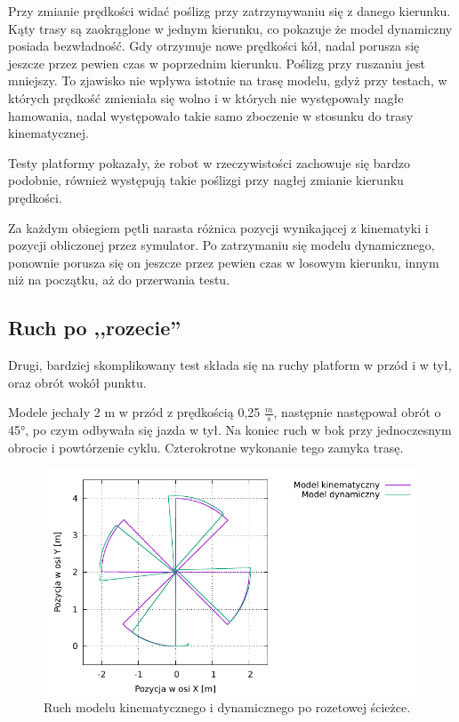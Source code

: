 		Przy zmianie prędkości widać poślizg przy zatrzymywaniu się z danego kierunku.
		Kąty trasy są zaokrąglone w jednym kierunku, co pokazuje że model dynamiczny posiada bezwładność. 
		Gdy otrzymuje nowe prędkości kół, nadal porusza się jeszcze przez pewien czas w poprzednim kierunku.
		Poślizg przy ruszaniu jest mniejszy.
		To zjawisko nie wpływa istotnie na trasę modelu, gdyż przy testach, w których prędkość zmieniała się wolno i w których nie występowały nagłe hamowania,
		nadal występowało takie samo zboczenie w stosunku do trasy kinematycznej.
		
		Testy platformy pokazały, że robot w rzeczywistości zachowuje się bardzo podobnie, również występują takie poślizgi przy nagłej zmianie kierunku prędkości.
		
		Za każdym obiegiem pętli narasta różnica pozycji wynikającej z kinematyki i pozycji obliczonej przez symulator.
		Po zatrzymaniu się modelu dynamicznego, ponownie porusza się on jeszcze przez pewien czas w losowym kierunku, innym niż na początku,
		aż do przerwania testu.
	
	\subsection{Ruch po ,,rozecie''}
		Drugi, bardziej skomplikowany test składa się na ruchy platform w przód i w tył, oraz obrót wokół punktu.
		
		Modele jechały 2 m w przód z prędkością 0,25 $\frac{m}{s}$, następnie następował obrót o 45°, po czym odbywała się jazda w tył.
		Na koniec ruch w bok przy jednoczesnym obrocie i powtórzenie cyklu. Czterokrotne wykonanie tego zamyka trasę.
		
		\begin{figure}[H]
			\centering
			\includegraphics[width=\textwidth]{plots/sun.pdf}
				\caption{Ruch modelu kinematycznego i dynamicznego po rozetowej ścieżce.}
			\label{plot:gramofon_sun}
		\end{figure}
		
